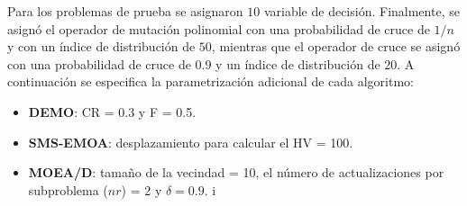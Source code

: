 % 
Para los problemas de prueba \UF{} se asignaron $10$ variable de decisión.
%
Finalmente, se asignó el operador de mutación polinomial con una probabilidad de cruce de $1/n$ y con un índice de distribución de $50$, mientras que el operador de cruce \SBX{} se asignó con una probabilidad de cruce de $0.9$ y un índice de distribución de $20$.
%
A continuación se especifica la parametrización adicional de cada algoritmo:
\begin{itemize}
\item \textbf{DEMO}: CR = 0.3 y F = 0.5.
\item \textbf{SMS-EMOA}: desplazamiento para calcular el HV = 100.
\item \textbf{MOEA/D}: tamaño de la vecindad = 10, el número de actualizaciones por subproblema ($nr$) = 2 y $\delta = 0.9$.
i%
\end{itemize}

